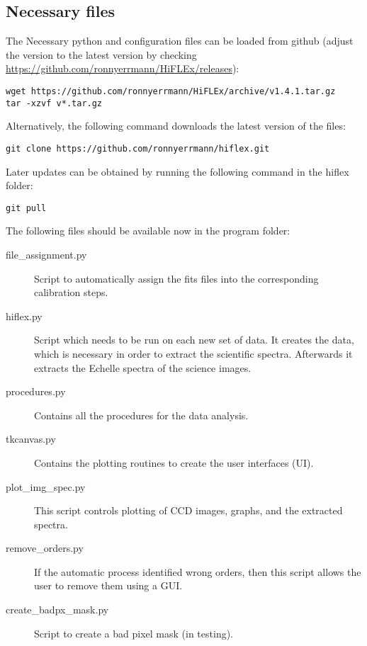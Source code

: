 \documentclass[10pt,a4paper]{article}
\begin{document}
\subsection{Necessary files}

\noindent The Necessary python and configuration files can be loaded from github (adjust the version to the latest version by checking \url{https://github.com/ronnyerrmann/HiFLEx/releases}):
\begin{lstlisting}[style=base]
wget https://github.com/ronnyerrmann/HiFLEx/archive/v1.4.1.tar.gz
tar -xzvf v*.tar.gz
\end{lstlisting}
Alternatively, the following command downloads the latest version of the files:
\begin{lstlisting}[style=base]
git clone https://github.com/ronnyerrmann/hiflex.git
\end{lstlisting}
Later updates can be obtained by running the following command in the hiflex folder:
\begin{lstlisting}[style=base]
git pull
\end{lstlisting}


\noindent The following files should be available now in the program folder:
\begin{description}
 \item[file\_assignment.py] Script to automatically assign the fits files into the corresponding calibration steps.
 \item[hiflex.py] Script which needs to be run on each new set of data. It creates the data, which is necessary in order to extract the scientific spectra. Afterwards it extracts the Echelle spectra of the science images.
 \item[procedures.py] Contains all the procedures for the data analysis.
 \item[tkcanvas.py] Contains the plotting routines to create the user interfaces (UI).
 \item[plot\_img\_spec.py] This script controls plotting of CCD images, graphs, and the extracted spectra.
 \item[remove\_orders.py] If the automatic process identified wrong orders, then this script allows the user to remove them using a GUI.
 \item[create\_badpx\_mask.py] Script to create a bad pixel mask (in testing).
\end{description}
\end{document}

